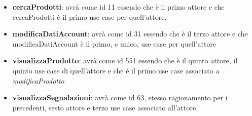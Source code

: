\begin{itemize}
    \item \textbf{cercaProdotti}: avrà come id 11 essendo che è il primo attore e che cercaProdotti è il primo use case per quell'attore.
    \item \textbf{modificaDatiAccount}: avrà come id 31 essendo che è il terzo attore e che modificaDatiAccount è il primo, e unico, use case per quell'attore
    \item \textbf{visualizzaProdotto}: avrà come id 551 essendo che è il quinto attore, il quinto use case di quell'attore e che è il primo use case associato a \textit{modificaProdotto}
    \item \textbf{visualizzaSegnalazioni}: avrà come id 63, stesso ragionamento per i precedenti, sesto attore e terzo use case associato all'attore.
\end{itemize}





